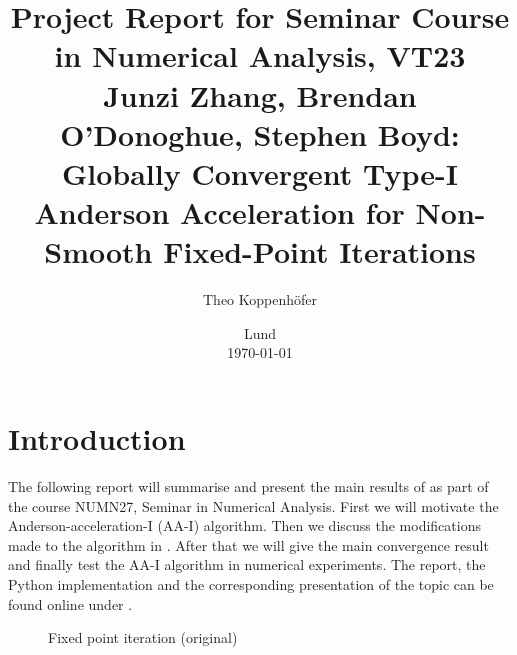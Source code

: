 




\title{ Project Report for Seminar Course in Numerical Analysis, VT23 \\[1ex]
	  \large Junzi Zhang, Brendan O'Donoghue, Stephen Boyd: Globally Convergent Type-I Anderson Acceleration for Non-Smooth Fixed-Point Iterations}
\author{Theo Koppenhöfer}
\date{Lund \\[1ex] \today}







\maketitle

\section{Introduction}

The following report will summarise and present the main results of  \cite{ZhaAA} as part of the course NUMN27, Seminar in Numerical Analysis.
First we will motivate the Anderson-acceleration-I (AA-I) algorithm.  Then we discuss the modifications made to the algorithm in \cite{ZhaAA}. After that we will give the main convergence result and finally test the AA-I algorithm in numerical experiments. The report, the Python implementation and the corresponding presentation of the topic can be found online under \cite{Repository}.


\begin{figure}
\centering
\begin{algorithm}[H]
\caption{Fixed point iteration (original)}
\label{alg:original}

\BlankLine
{}
\end{algorithm}
\end{figure}

